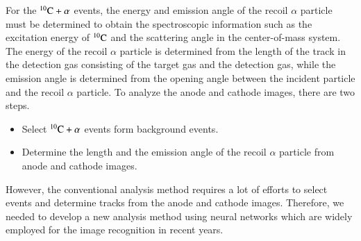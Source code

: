 \documentclass{jps-cp}
\begin{document}
For the ${}^{10}\rm{C}+\alpha$ events, the energy and emission angle of the recoil $\alpha$ particle must
be determined to obtain the spectroscopic information such as the excitation energy of ${}^{10}\rm{C}$
and the scattering angle in the center-of-mass system.
The energy of the recoil $\alpha$ particle is determined from the length of the track in the detection gas consisting of the target gas and the detection gas,
while the emission angle is determined from the opening angle between the incident particle and the recoil $\alpha$ particle.
To analyze the anode and cathode images, there are two steps.
\begin{itemize}
\item
  Select ${}^{10}\rm{C}+\alpha$ events form background events.
\item
  Determine the length and the emission angle of the recoil $\alpha$ particle from anode and cathode images.
\end{itemize}
However, the conventional analysis method requires a lot of efforts to select events and determine tracks from the anode and cathode images.
Therefore, we needed to develop a new analysis method using neural networks which are widely employed for the image recognition in recent years.
\end{document}
